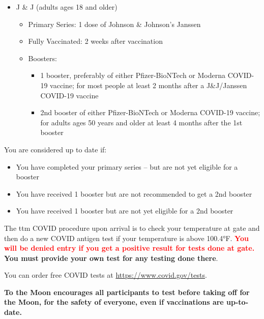 \begin{itemize}[noitemsep]
\begin{itemize}
\begin{itemize}
\begin{itemize}
            \end{itemize}
        \end{itemize}
        \item J \& J (adults ages 18 and older)
        \begin{itemize}
            \item Primary Series: 1 dose of Johnson \& Johnson’s Janssen
            \item Fully Vaccinated: 2 weeks after vaccination
            \item Boosters:
            \begin{itemize}
                \item 1 booster, preferably of either Pfizer-BioNTech or Moderna COVID-19 vaccine; for most people at least 2 months after a J\&J/Janssen COVID-19 vaccine
                \item 2nd booster of either Pfizer-BioNTech or Moderna COVID-19 vaccine; for adults ages 50 years and older at least 4 months after the 1st booster
            \end{itemize}
        \end{itemize}
    \end{itemize}
\end{itemize}

You are considered up to date if:
\begin{itemize}[noitemsep]
    \item You have completed your primary series – but are not yet eligible for a booster
    \item You have received 1 booster but are not recommended to get a 2nd booster
    \item You have received 1 booster but are not yet eligible for a 2nd booster

\end{itemize}

The \gls{ttm} COVID procedure upon arrival is to check your temperature at \gls{gate} and then do a new COVID antigen test if your temperature is above 100.4\si{\degree}F. \textbf{\textcolor{red}{You will be denied entry if you get a positive result for tests done at \gls{gate}.}}  \textbf{You must provide your own test for any testing done there}.

You can order free COVID tests at \url{https://www.covid.gov/tests}.

\textbf{To the Moon encourages all participants to test before taking off for the Moon, for the safety of everyone, even if vaccinations are up-to-date.}

